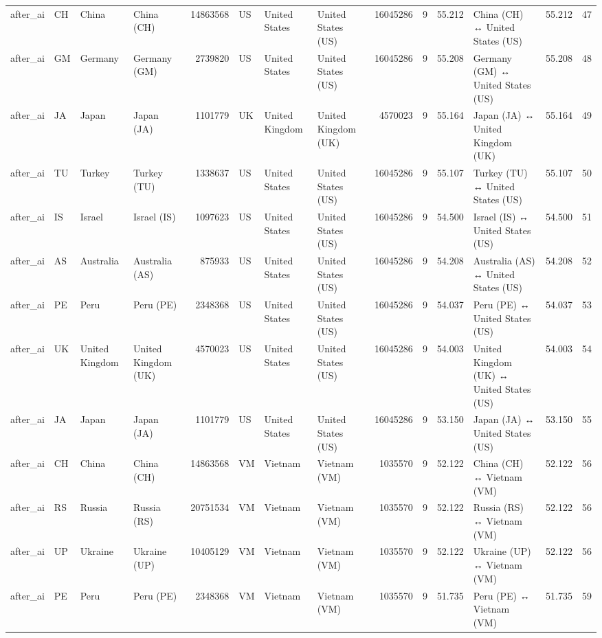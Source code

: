 \begin{tabular}{llllrlllrrrlrr}
after\_ai & CH & China & China (CH) & 14863568 & US & United States & United States (US) & 16045286 & 9 & 55.212 & China (CH) ↔ United States (US) & 55.212 & 47 \\
after\_ai & GM & Germany & Germany (GM) & 2739820 & US & United States & United States (US) & 16045286 & 9 & 55.208 & Germany (GM) ↔ United States (US) & 55.208 & 48 \\
after\_ai & JA & Japan & Japan (JA) & 1101779 & UK & United Kingdom & United Kingdom (UK) & 4570023 & 9 & 55.164 & Japan (JA) ↔ United Kingdom (UK) & 55.164 & 49 \\
after\_ai & TU & Turkey & Turkey (TU) & 1338637 & US & United States & United States (US) & 16045286 & 9 & 55.107 & Turkey (TU) ↔ United States (US) & 55.107 & 50 \\
after\_ai & IS & Israel & Israel (IS) & 1097623 & US & United States & United States (US) & 16045286 & 9 & 54.500 & Israel (IS) ↔ United States (US) & 54.500 & 51 \\
after\_ai & AS & Australia & Australia (AS) & 875933 & US & United States & United States (US) & 16045286 & 9 & 54.208 & Australia (AS) ↔ United States (US) & 54.208 & 52 \\
after\_ai & PE & Peru & Peru (PE) & 2348368 & US & United States & United States (US) & 16045286 & 9 & 54.037 & Peru (PE) ↔ United States (US) & 54.037 & 53 \\
after\_ai & UK & United Kingdom & United Kingdom (UK) & 4570023 & US & United States & United States (US) & 16045286 & 9 & 54.003 & United Kingdom (UK) ↔ United States (US) & 54.003 & 54 \\
after\_ai & JA & Japan & Japan (JA) & 1101779 & US & United States & United States (US) & 16045286 & 9 & 53.150 & Japan (JA) ↔ United States (US) & 53.150 & 55 \\
after\_ai & CH & China & China (CH) & 14863568 & VM & Vietnam & Vietnam (VM) & 1035570 & 9 & 52.122 & China (CH) ↔ Vietnam (VM) & 52.122 & 56 \\
after\_ai & RS & Russia & Russia (RS) & 20751534 & VM & Vietnam & Vietnam (VM) & 1035570 & 9 & 52.122 & Russia (RS) ↔ Vietnam (VM) & 52.122 & 56 \\
after\_ai & UP & Ukraine & Ukraine (UP) & 10405129 & VM & Vietnam & Vietnam (VM) & 1035570 & 9 & 52.122 & Ukraine (UP) ↔ Vietnam (VM) & 52.122 & 56 \\
after\_ai & PE & Peru & Peru (PE) & 2348368 & VM & Vietnam & Vietnam (VM) & 1035570 & 9 & 51.735 & Peru (PE) ↔ Vietnam (VM) & 51.735 & 59 \\

\end{tabular}
